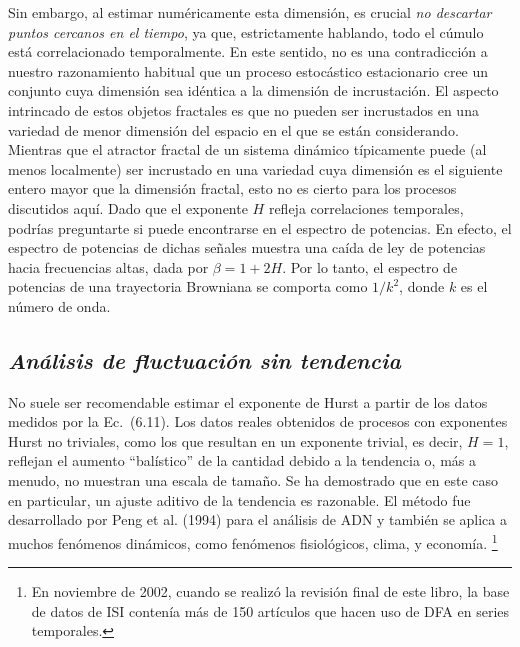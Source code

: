\documentclass[10pt,a4paper]{book}
\begin{document}
Sin embargo, al estimar numéricamente esta dimensión, es crucial \textit{no descartar puntos cercanos en el tiempo}, ya que, estrictamente hablando, todo el cúmulo está correlacionado temporalmente. En este sentido, no es una contradicción a nuestro razonamiento habitual que un proceso estocástico estacionario cree un conjunto cuya dimensión sea idéntica a la dimensión de incrustación. El aspecto intrincado de estos objetos fractales es que no pueden ser incrustados en una variedad de menor dimensión del espacio en el que se están considerando. Mientras que el atractor fractal de un sistema dinámico típicamente puede (al menos localmente) ser incrustado en una variedad cuya dimensión es el siguiente entero mayor que la dimensión fractal, esto no es cierto para los procesos discutidos aquí. Dado que el exponente \( H \) refleja correlaciones temporales, podrías preguntarte si puede encontrarse en el espectro de potencias. En efecto, el espectro de potencias de dichas señales muestra una caída de ley de potencias hacia frecuencias altas, dada por \( \beta = 1 + 2H \). Por lo tanto, el espectro de potencias de una trayectoria Browniana se comporta como \( 1/k^2 \), donde \( k \) es el número de onda.

\newpage

\subsection{\textit{Análisis de fluctuación sin tendencia}}

No suele ser recomendable estimar el exponente de Hurst a partir de los datos medidos por la Ec.~(6.11). Los datos reales obtenidos de procesos con exponentes Hurst no triviales, como los que resultan en un exponente trivial, es decir, \(H = 1\), reflejan el aumento “balístico” de la cantidad debido a la tendencia o, más a menudo, no muestran una escala de tamaño. Se ha demostrado que en este caso en particular, un ajuste aditivo de la tendencia es razonable. El método fue desarrollado por Peng et al. (1994) para el análisis de ADN y también se aplica a muchos fenómenos dinámicos, como fenómenos fisiológicos, clima, y economía. \footnote{En noviembre de 2002, cuando se realizó la revisión final de este libro, la base de datos de ISI contenía más de 150 artículos que hacen uso de DFA en series temporales.} 

\bigskip
\end{document}
